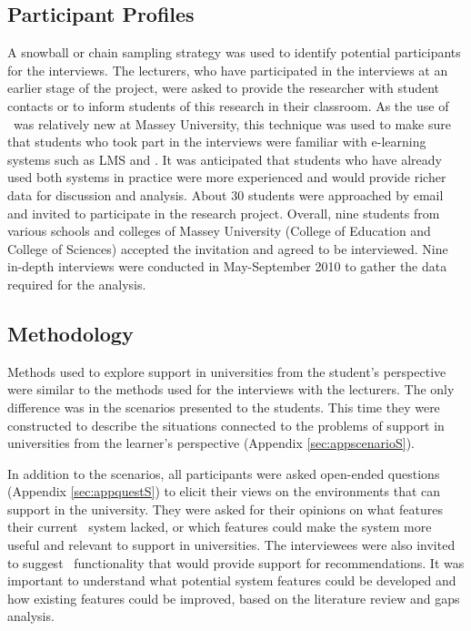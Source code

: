 \subsection{Participant Profiles}

A snowball or chain sampling strategy \citep{Mack2005, Marshall2010} was used to
identify potential participants for the interviews. The lecturers, who have
participated in the interviews at an earlier stage of the project, were asked to
provide the researcher with student contacts or to inform students of this
research in their classroom. As the use of \ep~was relatively new at Massey
University, this technique was used to make sure that students who took part in
the interviews were familiar with e-learning systems such as LMS and \ep. It was
anticipated that students who have already used both systems in practice were
more experienced and would provide richer data for discussion and analysis.
About 30 students were approached by email and invited to participate in the
research project. Overall, nine students from various schools and colleges of
Massey University (College of Education and College of Sciences) accepted the
invitation and agreed to be interviewed. Nine in-depth interviews were conducted
in May-September 2010 to gather the data required for the analysis.

\subsection{Methodology}

Methods used to explore \LLLs support in universities from the student's
perspective were similar to the methods used for the interviews with the
lecturers. The only difference was in the scenarios presented to the students.
This time they were constructed to describe the situations connected to the
problems of \LLLs support in universities from the learner's perspective
(Appendix \ref{sec:appscenarioS}).

In addition to the scenarios, all participants were asked open-ended questions
(Appendix \ref{sec:appquestS}) to elicit their views on the environments that
can support \LLLs in the university. They were asked for their opinions on what
features their current \ep~system lacked, or which features could make the
system more useful and relevant to \LLLs support in universities. The
interviewees were also invited to suggest \ep~functionality that would provide
support for \LLLs recommendations. It was important to understand what potential
system features could be developed and how existing features could be improved,
based on the literature review and gaps analysis.

